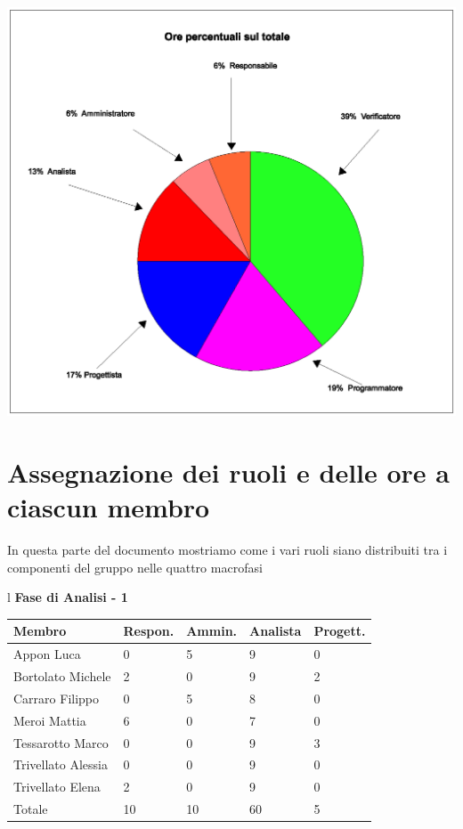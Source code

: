 \documentclass[11pt,titlepage,a4paper]{report}
\begin{document}
\begin{center}
\includegraphics [width=1\textwidth] {OrePercentuali.eps}
\end{center}


\section{Assegnazione dei ruoli e delle ore a ciascun membro}
In questa parte del documento mostriamo come i vari ruoli siano distribuiti 
tra i componenti del gruppo nelle quattro macrofasi

\begin{table}[hbtp]
\large{
\begin{tabular}{l}
\Large{\textbf{\textsf{Fase di Analisi - 1}}} \\
\begin{tabular}{||p{3.5cm}||p{2cm}||p{2cm}||p{2cm}||p{2cm}||}
\hline
\textbf{Membro} & \textbf{Respon.} & \textbf{Ammin.} & \textbf{Analista}
& \textbf{Progett.}\\
\hline
{Appon Luca}&0&5&9&0 \\ 
\hline 
{Bortolato Michele} &2&0&9&2\\ 
\hline
{Carraro Filippo}&0&5&8&0 \\
\hline
{Meroi Mattia}&6&0&7&0\\
\hline
{Tessarotto Marco} &0&0&9&3\\
\hline
{Trivellato Alessia} &0&0&9&0 \\
\hline
{Trivellato Elena} &2&0&9&0 \\
\hline
{Totale}& 10&10&60&5 \\
\hline
\end{tabular} \\
\end{tabular}
}
\end{table}
\end{document}
